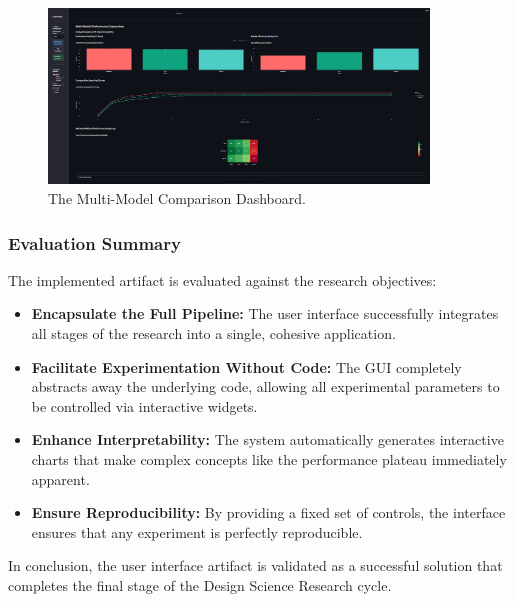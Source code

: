 \begin{figure}[htbp]
    \centering
    \includegraphics[width=0.9\textwidth]{Images/screenshot_multi_model.PNG}
    \caption{The Multi-Model Comparison Dashboard.}
    \label{fig:screenshot_multi}
\end{figure}

\subsubsection*{Evaluation Summary}
The implemented artifact is evaluated against the research objectives:
\begin{itemize}
    \item \textbf{Encapsulate the Full Pipeline:} The user interface successfully integrates all stages of the research into a single, cohesive application.
    \item \textbf{Facilitate Experimentation Without Code:} The GUI completely abstracts away the underlying code, allowing all experimental parameters to be controlled via interactive widgets.
    \item \textbf{Enhance Interpretability:} The system automatically generates interactive charts that make complex concepts like the performance plateau immediately apparent.
    \item \textbf{Ensure Reproducibility:} By providing a fixed set of controls, the interface ensures that any experiment is perfectly reproducible.
\end{itemize}

In conclusion, the user interface artifact is validated as a successful solution that completes the final stage of the Design Science Research cycle.